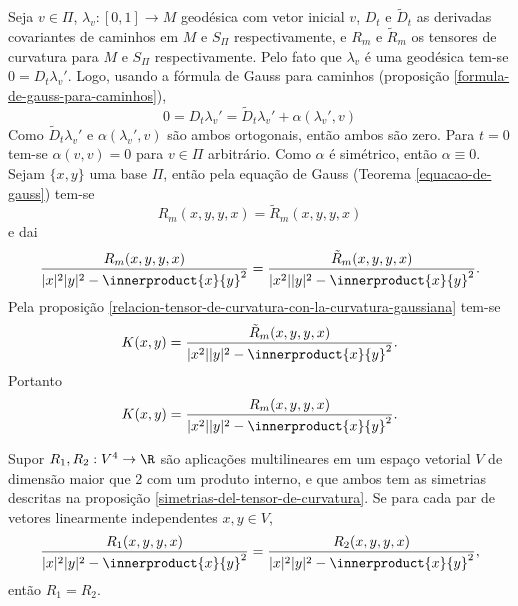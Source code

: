 \begin{demonstracao}
	Seja $v \in \Pi$,
	$\lambda_v: [0,1] \rightarrow M$ geodésica com vetor inicial $v$,
	$D_t$ e $\tilde{D}_t$ as derivadas covariantes de caminhos em $M$ e $S_{\Pi}$ respectivamente, e
	$R_m$ e $\tilde{R}_m$ os tensores de curvatura para $M$ e $S_{\Pi}$ respectivamente.
	Pelo fato que $\lambda_v$ é uma geodésica tem-se $0 = D_t \lambda_v'$. Logo, usando a fórmula de Gauss para caminhos (proposição \ref{formula-de-gauss-para-caminhos}),
	\begin{equation*}
	0 = D_t \lambda_v' = \tilde{D}_t \lambda_v' + \alpha(\lambda_v', v)
	\end{equation*}
	Como $\tilde{D}_t \lambda_v'$ e $\alpha(\lambda_v',v)$ são ambos ortogonais, então ambos são zero. Para $t=0$ tem-se $\alpha(v,v) = 0$ para $v \in \Pi$ arbitrário. Como $\alpha$ é simétrico, então $\alpha \equiv 0$.
	Sejam $\{x,y\}$ uma base $\Pi$, então pela equação de Gauss (Teorema \ref{equacao-de-gauss}) tem-se
	\begin{equation*}
	R_m(x,y,y,x) = \tilde{R}_m(x,y,y,x)
	\end{equation*}
	e dai
	\begin{equation*}
	\frac{R_m(x,y,y,x)}{|x|^2 |y|^2 - \innerproduct{x}{y}^2} = \frac{\tilde{R}_m(x,y,y,x)}{|x^2| |y|^2 - \innerproduct{x}{y}^2}.
	\end{equation*}
	Pela proposição \ref{relacion-tensor-de-curvatura-con-la-curvatura-gaussiana} tem-se
	\begin{equation*}
	K(x,y) = \frac{\tilde{R}_m(x,y,y,x)}{|x^2| |y|^2 - \innerproduct{x}{y}^2}.
	\end{equation*}
	Portanto
	\begin{equation*}
	K(x,y) = \frac{R_m(x,y,y,x)}{|x^2| |y|^2 - \innerproduct{x}{y}^2}.
	\end{equation*}
\end{demonstracao}

\begin{lema}\label{igualdade-de-4-tensores-covariantes}
	Supor $R_1,R_2: V^4 \rightarrow \R$ são aplicações multilineares em um espaço vetorial $V$ de dimensão maior que 2 com um produto interno, e que ambos tem as simetrias descritas na proposição \ref{simetrias-del-tensor-de-curvatura}. Se para cada par de vetores linearmente independentes $x,y \in V$,
	\begin{equation*}
	\frac{R_1(x,y,y,x)}{|x|^2 |y|^2 - \innerproduct{x}{y}^2} = \frac{R_2(x,y,y,x)}{|x|^2 |y|^2 - \innerproduct{x}{y}^2},
	\end{equation*}
	então $R_1 = R_2$.
\end{lema}

